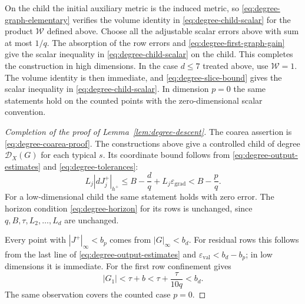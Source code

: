On the child the initial auxiliary metric is the induced metric, so
\eqref{eq:degree-graph-elementary} verifies the volume identity in
\eqref{eq:degree-child-scalar} for the product $\mathcal W$ defined above.
Choose all the adjustable scalar errors above with sum at most $1/q$.
The absorption of the row errors and
\eqref{eq:degree-first-graph-gain} give the scalar inequality in
\eqref{eq:degree-child-scalar} on the child.
This completes the construction in high dimensions.  In the case
$d\le7$ treated above, use $\mathcal W=1$.  The volume identity is then
immediate, and \eqref{eq:degree-slice-bound} gives the scalar inequality
in \eqref{eq:degree-child-scalar}.  In dimension $p=0$ the same statements
hold on the counted points with the zero-dimensional scalar convention.

\begin{proof}[Completion of the proof of Lemma~\ref{lem:degree-descent}]
The coarea assertion is \eqref{eq:degree-coarea-proof}.  The constructions
above give a controlled child of degree $\mathcal D_X(G)$ for each typical
$s$.  Its coordinate bound follows from
\eqref{eq:degree-output-estimates} and \eqref{eq:degree-tolerances}:
\[
 L_j|dJ_j^+|_{h^+}\le B-\frac dq+L_j\varepsilon_{\mathrm{grad}}
                         <B-\frac pq.
\]
For a low-dimensional child the same statement holds with zero error.
The horizon condition \eqref{eq:degree-horizon} for its rows is unchanged,
since $q,B,\tau,L_2,\ldots,L_d$ are unchanged.

Every point with $|J^+|_\infty<b_p$ comes from
$|G|_\infty<b_d$.  For residual rows this follows from the last line of
\eqref{eq:degree-output-estimates} and
$\varepsilon_{\mathrm{val}}<b_d-b_p$; in low dimensions it is immediate.
For the first row confinement gives
\[
       |G_1|<\tau+b<\tau+\frac{\tau}{10q}<b_d.
\]
The same observation covers the counted case $p=0$.


\end{proof}
